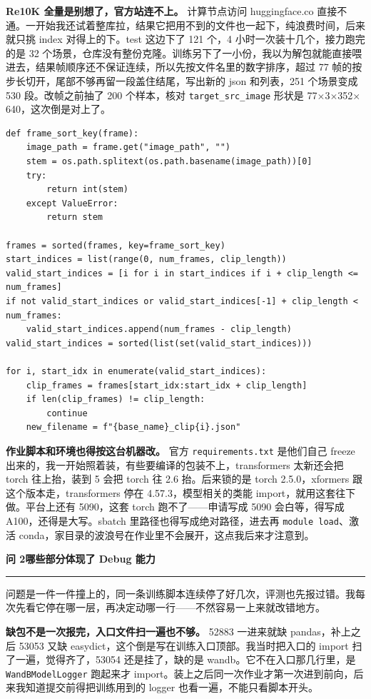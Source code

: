 \documentclass[UTF8,a4paper,11pt,fontset=none]{ctexart}
\newcommand{\ask}[1]{%
  \par\vspace{5mm}%
  {\noindent\fontsize{13}{18}\selectfont\bfseries #1\par}
  \nobreak\vspace{1.2mm}%
  {\color{ink}\noindent\rule{\linewidth}{0.45pt}\par}
  \nobreak\vspace{2.6mm}%
}
\newcommand{\point}[1]{\par\noindent\textbf{#1}\hspace{0.4em}}
\newcommand{\src}[1]{\par\vspace{0.6mm}\Needspace{14\baselineskip}\noindent{\fontsize{8.5}{11}\selectfont\color{muted}#1}\par}
\begin{document}
\point{Re10K 全量是别想了，官方站连不上。}
计算节点访问 \mbox{huggingface.co} 直接不通。一开始我还试着整库拉，结果它把用不到的文件也一起下，纯浪费时间，后来就只挑 index 对得上的下。test 这边下了 121 个，4 小时一次装十几个，接力跑完的是 32 个场景，仓库没有整份克隆。训练另下了一小份，我以为解包就能直接喂进去，结果帧顺序还不保证连续，所以先按文件名里的数字排序，超过 77 帧的按步长切开，尾部不够再留一段盖住结尾，写出新的 json 和列表，251 个场景变成 530 段。改帧之前抽了 200 个样本，核对 \texttt{target\_src\_image} 形状是 77$\times$3$\times$352$\times$640，这次倒是对上了。

\src{scripts/re10K\_clips\_process.py}
\begin{Verbatim}
def frame_sort_key(frame):
    image_path = frame.get("image_path", "")
    stem = os.path.splitext(os.path.basename(image_path))[0]
    try:
        return int(stem)
    except ValueError:
        return stem

frames = sorted(frames, key=frame_sort_key)
start_indices = list(range(0, num_frames, clip_length))
valid_start_indices = [i for i in start_indices if i + clip_length <= num_frames]
if not valid_start_indices or valid_start_indices[-1] + clip_length < num_frames:
    valid_start_indices.append(num_frames - clip_length)
valid_start_indices = sorted(list(set(valid_start_indices)))

for i, start_idx in enumerate(valid_start_indices):
    clip_frames = frames[start_idx:start_idx + clip_length]
    if len(clip_frames) != clip_length:
        continue
    new_filename = f"{base_name}_clip{i}.json"
\end{Verbatim}

\point{作业脚本和环境也得按这台机器改。}
官方 \texttt{requirements.txt} 是他们自己 freeze 出来的，我一开始照着装，有些要编译的包装不上，transformers 太新还会把 torch 往上抬，装到 5 会把 torch 往 2.6 抬。后来锁的是 torch 2.5.0，xformers 跟这个版本走，transformers 停在 4.57.3，模型相关的类能 import，就用这套往下做。平台上还有 5090，这套 torch 跑不了——申请写成 5090 会白等，得写成 A100，还得是大写。sbatch 里路径也得写成绝对路径，进去再 \texttt{module load}、激活 conda，家目录的波浪号在作业里不会展开，这点我后来才注意到。

\ask{问 2\quad 哪些部分体现了 Debug 能力}

问题是一件一件撞上的，同一条训练脚本连续停了好几次，评测也先报过错。我每次先看它停在哪一层，再决定动哪一行——不然容易一上来就改错地方。

\point{缺包不是一次报完，入口文件扫一遍也不够。}
52883 一进来就缺 pandas，补上之后 53053 又缺 easydict，这个倒是写在训练入口顶部。我当时把入口的 import 扫了一遍，觉得齐了，53054 还是挂了，缺的是 wandb。它不在入口那几行里，是 \texttt{WandBModelLogger} 跑起来才 import。装上之后同一次作业才第一次进到前向，后来我知道提交前得把训练用到的 logger 也看一遍，不能只看脚本开头。
\end{document}
